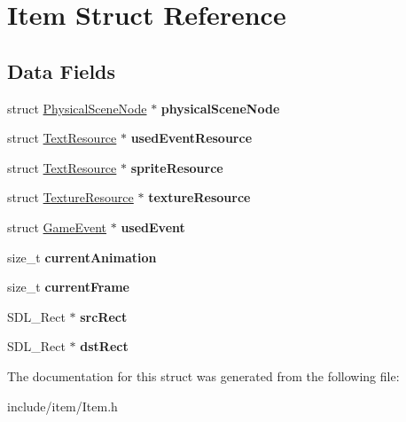 \hypertarget{struct_item}{}\section{Item Struct Reference}
\label{struct_item}
\subsection*{Data Fields}
\begin{DoxyCompactItemize}
\item 
\hypertarget{struct_item_a56a0370780499062e6f778b7539adfda}{}\label{struct_item_a56a0370780499062e6f778b7539adfda} 
struct \hyperlink{struct_physical_scene_node}{Physical\+Scene\+Node} $\ast$ {\bfseries physical\+Scene\+Node}
\item 
\hypertarget{struct_item_a9ea528b1f7f8a0cecf1125c2515c3cf9}{}\label{struct_item_a9ea528b1f7f8a0cecf1125c2515c3cf9} 
struct \hyperlink{struct_text_resource}{Text\+Resource} $\ast$ {\bfseries used\+Event\+Resource}
\item 
\hypertarget{struct_item_ac402150bd2243d7a6f04756f7b624fa1}{}\label{struct_item_ac402150bd2243d7a6f04756f7b624fa1} 
struct \hyperlink{struct_text_resource}{Text\+Resource} $\ast$ {\bfseries sprite\+Resource}
\item 
\hypertarget{struct_item_aedd0da0c072332f83e64105f8682bbdf}{}\label{struct_item_aedd0da0c072332f83e64105f8682bbdf} 
struct \hyperlink{struct_texture_resource}{Texture\+Resource} $\ast$ {\bfseries texture\+Resource}
\item 
\hypertarget{struct_item_aca12a18a790b1a1e2f33383502f8c054}{}\label{struct_item_aca12a18a790b1a1e2f33383502f8c054} 
struct \hyperlink{struct_game_event}{Game\+Event} $\ast$ {\bfseries used\+Event}
\item 
\hypertarget{struct_item_a712df7aeb9afad06723b1d6039536010}{}\label{struct_item_a712df7aeb9afad06723b1d6039536010} 
size\+\_\+t {\bfseries current\+Animation}
\item 
\hypertarget{struct_item_a3ff28beecee781f499b33b0884780b85}{}\label{struct_item_a3ff28beecee781f499b33b0884780b85} 
size\+\_\+t {\bfseries current\+Frame}
\item 
\hypertarget{struct_item_a7ad203f83ba9f4362e9fdd624df60090}{}\label{struct_item_a7ad203f83ba9f4362e9fdd624df60090} 
S\+D\+L\+\_\+\+Rect $\ast$ {\bfseries src\+Rect}
\item 
\hypertarget{struct_item_a7c80019eb2315edac6e37bf0e68cbe71}{}\label{struct_item_a7c80019eb2315edac6e37bf0e68cbe71} 
S\+D\+L\+\_\+\+Rect $\ast$ {\bfseries dst\+Rect}
\end{DoxyCompactItemize}


The documentation for this struct was generated from the following file\+:\begin{DoxyCompactItemize}
\item 
include/item/Item.\+h\end{DoxyCompactItemize}
